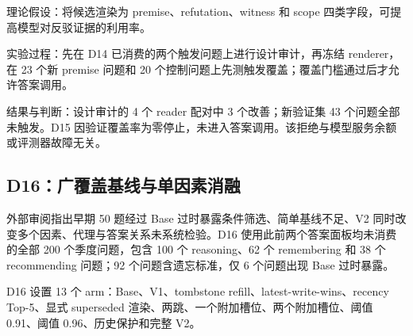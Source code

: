 理论假设：将候选渲染为 premise、refutation、witness 和 scope 四类字段，可提高模型对反驳证据的利用率。

实验过程：先在 D14 已消费的两个触发问题上进行设计审计，再冻结 renderer，在 23 个新 premise 问题和 20 个控制问题上先测触发覆盖；覆盖门槛通过后才允许答案调用。

结果与判断：设计审计的 4 个 reader 配对中 3 个改善；新验证集 43 个问题全部未触发。D15 因验证覆盖率为零停止，未进入答案调用。该拒绝与模型服务余额或评测器故障无关。

\subsection{D16：广覆盖基线与单因素消融}

外部审阅指出早期 50 题经过 Base 过时暴露条件筛选、简单基线不足、V2 同时改变多个因素、代理与答案关系未系统检验。D16 使用此前两个答案面板均未消费的全部 200 个季度问题，包含 100 个 reasoning、62 个 remembering 和 38 个 recommending 问题；92 个问题含遗忘标准，仅 6 个问题出现 Base 过时暴露。

D16 设置 13 个 arm：Base、V1、tombstone refill、latest-write-wins、recency Top-5、显式 superseded 渲染、两跳、一个附加槽位、两个附加槽位、阈值 0.91、阈值 0.96、历史保护和完整 V2。

